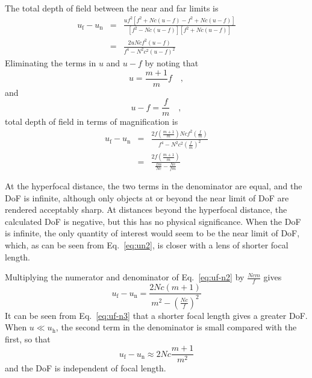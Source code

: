 \documentclass[11pt, oneside]{scrartcl}   	%
\begin{document}
The total depth of field between the near and far limits is
\begin{eqnarray}
     u_\mathrm{f}-u_\mathrm{n} &=& \frac{uf^2 \left[f^2 +N\!c(u- f)- f^2 +N\!c(u-f)\right]}{\left[f^2 -N\!c(u-f)\right]\left[f^2 +N\!c(u-f)\right]}\nonumber\\
     & =& 
     \frac{ 2uN\!cf^2 (u- f)}{f^4 -N^2c^2(u-f)^2}
   \label{eq:uf-n1}
\end{eqnarray}
Eliminating the terms in $u$ and $u - f$ by noting that 
\begin{equation}
u = \frac{m+1}m f\quad ,
\end{equation}
and
\begin{equation}
    u-f = \frac f m\quad,
\end{equation}
total depth of field in terms of magnification is
\begin{eqnarray}
u_\mathrm{f}-u_\mathrm{n} &=& \frac{2f\left(\frac{m+1}m\right)N\!cf^2\left(\frac f m\right)}{f^4 -N^2c^2\left(\frac f m\right)^2} \nonumber\\
&=& \frac{2f\left(\frac{m+1}m\right)}{\frac{fm}{N\!c}-\frac{N\!c}{fm}}
\label{eq:uf-n2}
\end{eqnarray}

At the hyperfocal distance, the two terms in the denominator are equal, and the DoF is infinite, although only objects at or beyond the near limit of DoF are rendered acceptably sharp. At distances beyond the hyperfocal distance, the calculated DoF is negative, but this has no physical significance. When the DoF is infinite, the only quantity of interest would seem to be the near limit of DoF, which, as can be seen from Eq.~\ref{eq:un2}, is closer with a lens of shorter focal length.

Multiplying the numerator and denominator of Eq.~\ref{eq:uf-n2} by $\frac{N\!cm}f$
gives
\begin{equation}
   u_\mathrm{f}-u_\mathrm{n} = \frac{2N\!c(m+1)}{m^2-\left(\frac{N\!c}f\right)^2}
      \label{eq:uf-n3}
\end{equation}
It can be seen from Eq.~\ref{eq:uf-n3} that a shorter focal length
gives a greater DoF. When $u \ll u_\mathrm{h}$, the second term in the denominator is small compared with the first, so that
\begin{equation}
   u_\mathrm{f}-u_\mathrm{n} \approx 2N\!c\frac{m+1}{m^2}
   \label{eq:uf-n4}
\end{equation}
and the DoF is independent of focal length.
\end{document}

